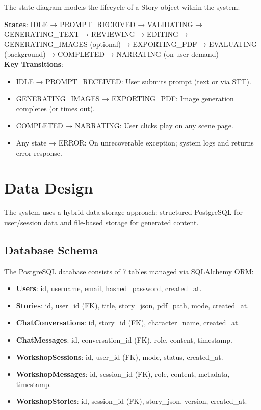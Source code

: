 The state diagram models the lifecycle of a Story object within the system:

\textbf{States}: IDLE → PROMPT\_RECEIVED → VALIDATING → GENERATING\_TEXT → REVIEWING → EDITING → GENERATING\_IMAGES (optional) → EXPORTING\_PDF → EVALUATING (background) → COMPLETED → NARRATING (on user demand) \\
\textbf{Key Transitions}:
\begin{itemize}
    \item IDLE → PROMPT\_RECEIVED: User submits prompt (text or via STT).
    \item GENERATING\_IMAGES → EXPORTING\_PDF: Image generation completes (or times out).
    \item COMPLETED → NARRATING: User clicks play on any scene page.
    \item Any state → ERROR: On unrecoverable exception; system logs and returns error response.
\end{itemize}


\section{Data Design}

The system uses a hybrid data storage approach: structured PostgreSQL for user/session data and file-based storage for generated content.

\subsection{Database Schema}

The PostgreSQL database consists of 7 tables managed via SQLAlchemy ORM:

\begin{itemize}
    \item \textbf{Users}: id, username, email, hashed\_password, created\_at.
    \item \textbf{Stories}: id, user\_id (FK), title, story\_json, pdf\_path, mode, created\_at.
    \item \textbf{ChatConversations}: id, story\_id (FK), character\_name, created\_at.
    \item \textbf{ChatMessages}: id, conversation\_id (FK), role, content, timestamp.
    \item \textbf{WorkshopSessions}: id, user\_id (FK), mode, status, created\_at.
    \item \textbf{WorkshopMessages}: id, session\_id (FK), role, content, metadata, timestamp.
    \item \textbf{WorkshopStories}: id, session\_id (FK), story\_json, version, created\_at.
\end{itemize}

